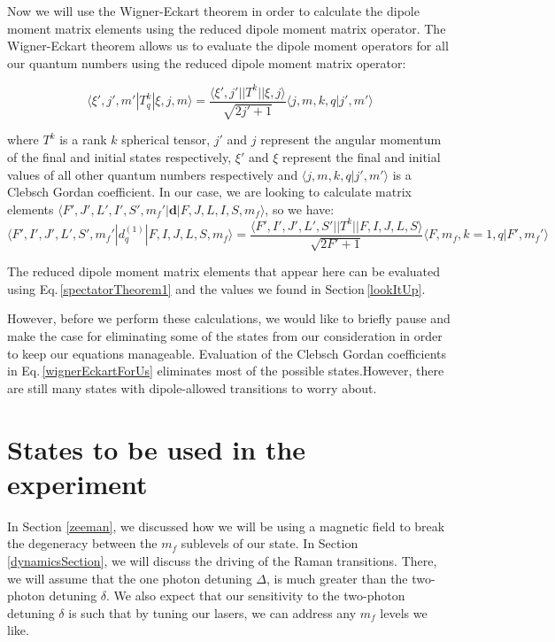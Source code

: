 Now we will use the Wigner-Eckart theorem in order to calculate the dipole moment matrix elements using the reduced dipole moment matrix operator. The Wigner-Eckart theorem allows us to evaluate the dipole moment operators for all our quantum numbers using the reduced dipole moment matrix operator:

\begin{equation}\label{wignerEckart}
\langle \xi',j',m'|T^k_q|\xi,j,m\rangle = \frac{\langle \xi',j'||T^k||\xi,j\rangle}{\sqrt{2j'+1}}\langle j,m,k,q|j',m'\rangle
\end{equation}

where $T^k$ is a rank $k$ spherical tensor, $j'$ and $j$ represent the angular momentum of the final and initial states respectively, $\xi'$ and $\xi$ represent the final and initial values of all other quantum numbers respectively and $\langle j,m,k,q|j',m'\rangle$ is a Clebsch Gordan coefficient. In our case, we are looking to calculate matrix elements  $\langle F',J',L',I',S',m_f'|\mathbf{d}|F,J,L,I,S,m_f\rangle$, so we have:
\begin{equation}\label{wignerEckartForUs}
\langle F',I',J',L',S',m_f'|d^{(1)}_q|F,I,J,L,S,m_f\rangle = \frac{\langle F',I',J',L',S'||T^k||F,I,J,L,S\rangle}{\sqrt{2F'+1}}\langle F,m_f,k=1,q|F',m_f'\rangle
\end{equation}

The reduced dipole moment matrix elements that appear here can be evaluated using Eq.\,\ref{spectatorTheorem1} and the values we found in Section\,\ref{lookItUp}. 

However, before we perform these calculations, we would like to briefly pause and make the case for eliminating some of the states from our consideration in order to keep our equations manageable. 
Evaluation of the Clebsch Gordan coefficients in Eq.\,\ref{wignerEckartForUs} eliminates most of the possible states.However, there are still many states with dipole-allowed transitions to worry about. 

\section{States to be used in the experiment}

In Section \ref{zeeman}, we discussed how we will be using a magnetic field to break the degeneracy between the $m_f$ sublevels of our state.
In Section \ref{dynamicsSection}, we will discuss the driving of the Raman transitions. There, we will assume that the one photon detuning $\Delta$, is much greater than the two-photon detuning $\delta$. We also expect that our sensitivity to the two-photon detuning $\delta$ is such that by tuning our lasers, we can address any $m_f$ levels we like.

